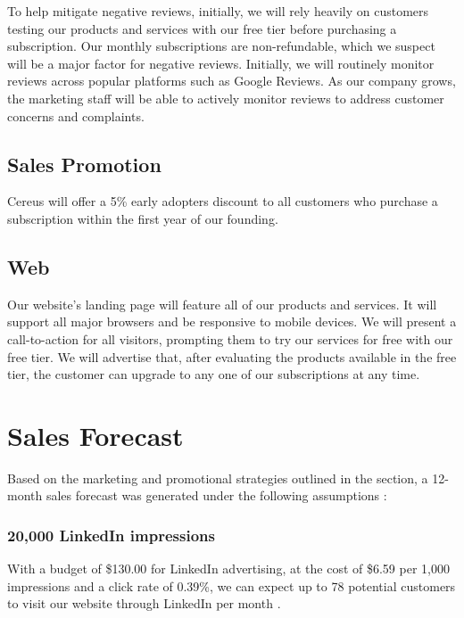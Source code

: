 To help mitigate negative reviews, initially, we will rely heavily on customers testing our products and services with our free tier before purchasing a subscription. Our monthly subscriptions are non-refundable, which we suspect will be a major factor for negative reviews. Initially, we will routinely monitor reviews across popular platforms such as Google Reviews. As our company grows, the marketing staff will be able to actively monitor reviews to address customer concerns and complaints.

\subsection{Sales Promotion}

Cereus will offer a 5\% early adopters discount to all customers who purchase a subscription within the first year of our founding.

\subsection{Web}

Our website's landing page will feature all of our products and services. It will support all major browsers and be responsive to mobile devices. We will present a call-to-action for all visitors, prompting them to try our services for free with our free tier. We will advertise that, after evaluating the products available in the free tier, the customer can upgrade to any one of our subscriptions at any time.
 

\section{Sales Forecast} \label{section.sales.forecast}

Based on the marketing and promotional strategies outlined in the  section, a 12-month sales forecast was generated under the following assumptions \cite{sales.forecast.2020}:


\subsubsection*{20,000 LinkedIn impressions}

With a budget of \$130.00 for LinkedIn advertising, at the cost of \$6.59 per 1,000 impressions and a click rate of 0.39\%, we can expect up to 78 potential customers to visit our website through LinkedIn per month \cite{wilcox.2020}.

